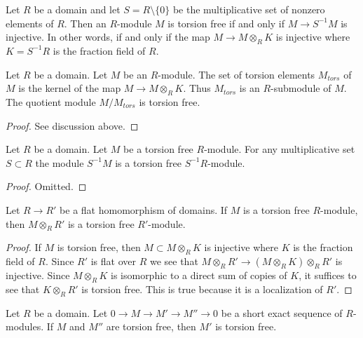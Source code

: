 \noindent
Let $R$ be a domain and let $S = R \setminus \{0\}$ be the multiplicative
set of nonzero elements of $R$. Then an $R$-module $M$ is torsion free if
and only if $M \to S^{-1}M$ is injective. In other words, if and only if
the map $M \to M \otimes_R K$ is injective where $K = S^{-1}R$ is the fraction
field of $R$.

\begin{lemma}
\label{lemma-torsion}
Let $R$ be a domain. Let $M$ be an $R$-module. The set of torsion elements
$M_{tors}$ of $M$ is the kernel of the map $M \to M \otimes_R K$.
Thus $M_{tors}$ is an $R$-submodule of $M$.
The quotient module $M/M_{tors}$ is torsion free.
\end{lemma}

\begin{proof}
See discussion above.
\end{proof}

\begin{lemma}
\label{lemma-localize-torsion}
Let $R$ be a domain. Let $M$ be a torsion free $R$-module.
For any multiplicative set $S \subset R$ the module
$S^{-1}M$ is a torsion free $S^{-1}R$-module.
\end{lemma}

\begin{proof}
Omitted.
\end{proof}

\begin{lemma}
\label{lemma-flat-pullback-torsion}
Let $R \to R'$ be a flat homomorphism of domains. If $M$ is a torsion
free $R$-module, then $M \otimes_R R'$ is a torsion free $R'$-module.
\end{lemma}

\begin{proof}
If $M$ is torsion free, then $M \subset M \otimes_R K$ is injective
where $K$ is the fraction field of $R$. Since $R'$ is flat over $R$
we see that $M \otimes_R R' \to (M \otimes_R K) \otimes_R R'$ is injective.
Since $M \otimes_R K$ is isomorphic to a direct sum of copies of $K$,
it suffices to see that $K \otimes_R R'$ is torsion free. This is true
because it is a localization of $R'$.
\end{proof}

\begin{lemma}
\label{lemma-extension-torsion-free}
Let $R$ be a domain. Let $0 \to M \to M' \to M'' \to 0$
be a short exact sequence of $R$-modules. If $M$ and $M''$
are torsion free, then $M'$ is torsion free.
\end{lemma}

